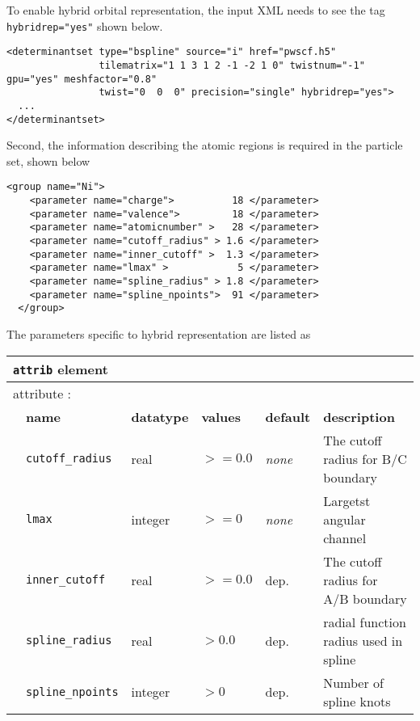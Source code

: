 To enable hybrid orbital representation, the input XML needs to see the tag \texttt{hybridrep="yes"} shown below.
\begin{lstlisting}[caption=Hybrid orbital representation input example.\label{listing:hybridrep}]
<determinantset type="bspline" source="i" href="pwscf.h5"
                tilematrix="1 1 3 1 2 -1 -2 1 0" twistnum="-1" gpu="yes" meshfactor="0.8"
                twist="0  0  0" precision="single" hybridrep="yes">
  ...
</determinantset>
\end{lstlisting}
Second, the information describing the atomic regions is required in the particle set, shown below
\begin{lstlisting}[style=XML,caption=particleset elements for ions with information needed by hybrid orbital representation.\label{listing:hybridrep_particleset}]
  <group name="Ni">
    <parameter name="charge">          18 </parameter>
    <parameter name="valence">         18 </parameter>
    <parameter name="atomicnumber" >   28 </parameter>
    <parameter name="cutoff_radius" > 1.6 </parameter>
    <parameter name="inner_cutoff" >  1.3 </parameter>
    <parameter name="lmax" >            5 </parameter>
    <parameter name="spline_radius" > 1.8 </parameter>
    <parameter name="spline_npoints">  91 </parameter>
  </group>
\end{lstlisting}

The parameters specific to hybrid representation are listed as
\begin{table}[h]
\centering
\begin{tabularx}{\textwidth}{l l l l l l }
\hline
\multicolumn{6}{l}{\texttt{attrib} element} \\
\hline
\multicolumn{2}{l}{attribute      :} & \multicolumn{4}{l}{}\\
   &   \bfseries name            & \bfseries datatype & \bfseries values & \bfseries default   & \bfseries description \\
   &   \texttt{cutoff\_radius}             &  real            &  $>=0.0$    &  \textit{none}    & The cutoff radius for B/C boundary  \\
   &   \texttt{lmax}         &  integer            &  $>=0$ &  \textit{none} & Largetst angular channel \\
   &   \texttt{inner\_cutoff}             &  real            &  $>=0.0$    &  dep.    & The cutoff radius for A/B boundary  \\
   &   \texttt{spline\_radius}         &  real            &  $>0.0$ &  dep. & radial function radius used in spline \\
   &   \texttt{spline\_npoints}         &  integer            &  $>0$ &  dep. & Number of spline knots \\
  \hline
\end{tabularx}
\end{table}

